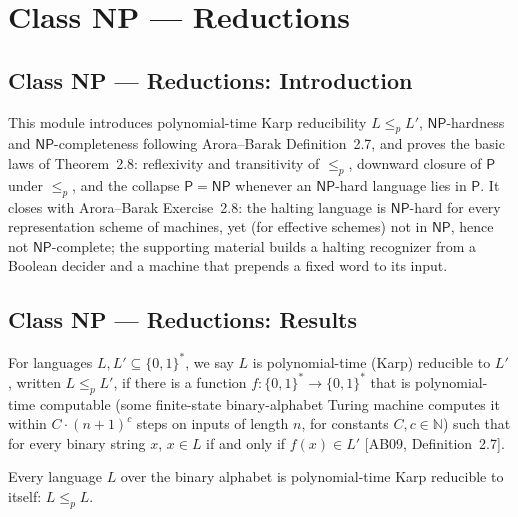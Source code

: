 \section{Class NP --- Reductions}
\subsection*{Class NP --- Reductions: Introduction}

This module introduces polynomial-time Karp reducibility $L \le_p L'$,
$\mathsf{NP}$-hardness and $\mathsf{NP}$-completeness following Arora--Barak
Definition~2.7, and proves the basic laws of Theorem~2.8: reflexivity and
transitivity of $\le_p$, downward closure of $\mathsf{P}$ under $\le_p$, and the
collapse $\mathsf{P} = \mathsf{NP}$ whenever an $\mathsf{NP}$-hard language lies
in $\mathsf{P}$. It closes with Arora--Barak Exercise~2.8: the halting language
is $\mathsf{NP}$-hard for every representation scheme of machines, yet (for
effective schemes) not in $\mathsf{NP}$, hence not $\mathsf{NP}$-complete; the
supporting material builds a halting recognizer from a Boolean decider and a
machine that prepends a fixed word to its input.

\subsection*{Class NP --- Reductions: Results}

\begin{definition}
\label{Complexity.PolyTimeReducible}
\leanok
{}
For languages $L, L' \subseteq \{0,1\}^{*}$, we say $L$ is polynomial-time
(Karp) reducible to $L'$, written $L \le_p L'$, if there is a function
$f : \{0,1\}^{*} \to \{0,1\}^{*}$ that is polynomial-time computable (some
finite-state binary-alphabet Turing machine computes it within $C \cdot (n+1)^c$
steps on inputs of length $n$, for constants $C, c \in \mathbb{N}$) such that for
every binary string $x$, $x \in L$ if and only if $f(x) \in L'$
[AB09, Definition~2.7].
\end{definition}

\begin{theorem}
\label{Complexity.PolyTimeReducible.refl}
\leanok
{}
Every language $L$ over the binary alphabet is polynomial-time Karp reducible to itself:
$L\le_p L$.
\end{theorem}

